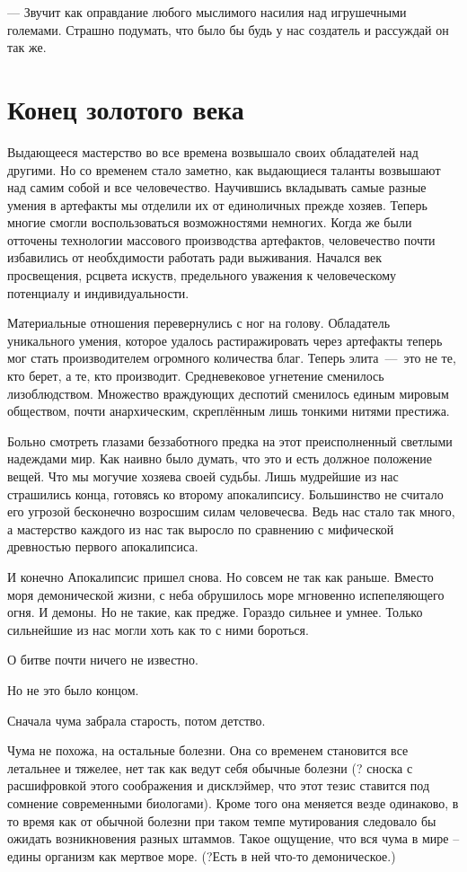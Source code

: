 \documentclass[12pt,a4paper]{article}
\begin{document}
--- Звучит как оправдание любого мыслимого насилия над игрушечными големами. Страшно подумать, что было бы будь у нас создатель и рассуждай он так же.


\section*{Конец золотого века}

Выдающееся мастерство во все времена возвышало своих обладателей над другими. Но со временем стало заметно, как выдающиеся таланты возвышают над самим собой и все человечество. 
Научившись вкладывать самые разные умения в артефакты мы отделили их от единоличных прежде хозяев. Теперь многие смогли воспользоваться возможностями немногих. Когда же были отточены технологии массового производства артефактов, человечество почти избавились от необхдимости работать ради выживания. Начался век просвещения, рсцвета искуств, предельного уважения к человеческому потенциалу и индивидуальности. 

Материальные отношения перевернулись с ног на голову. Обладатель уникального умения, которое удалось растиражировать через артефакты теперь мог стать производителем огромного количества благ. Теперь элита~---~это не те, кто берет, а те, кто производит. Средневековое угнетение сменилось лизоблюдством. Множество враждующих деспотий сменилось единым мировым обществом, почти анархическим, скреплённым лишь тонкими нитями престижа.

Больно смотреть глазами беззаботного предка на этот преисполненный светлыми надеждами мир. Как наивно было думать, что это и есть должное положение вещей. Что мы могучие хозяева своей судьбы. Лишь мудрейшие из нас страшились конца, готовясь ко второму апокалипсису. Большинство не считало его угрозой бесконечно возросшим силам человечесва. Ведь нас стало так много, а мастерство каждого из нас так выросло по сравнению с мифической древностью первого апокалипсиса.

И конечно Апокалипсис пришел снова. Но совсем не так как раньше. Вместо моря демонической жизни, с неба обрушилось море мгновенно испепеляющего огня. И демоны. Но не такие, как предже. Гораздо сильнее и умнее. Только сильнейшие из нас могли хоть как то с ними бороться.


О битве почти ничего не известно. 

Но не это было концом.

Сначала чума забрала старость, потом детство.

Чума не похожа, на остальные болезни. Она со временем становится все летальнее и тяжелее, нет так как ведут себя обычные болезни (? сноска с расшифровкой этого соображения и дисклэймер, что этот тезис ставится под сомнение современными биологами). Кроме того она меняется везде одинаково, в то время как от обычной болезни при таком темпе мутирования следовало бы ожидать возникновения разных штаммов. Такое ощущение, что вся чума в мире -- едины организм как мертвое море. (?Есть в ней что-то демоническое.)
\end{document}
